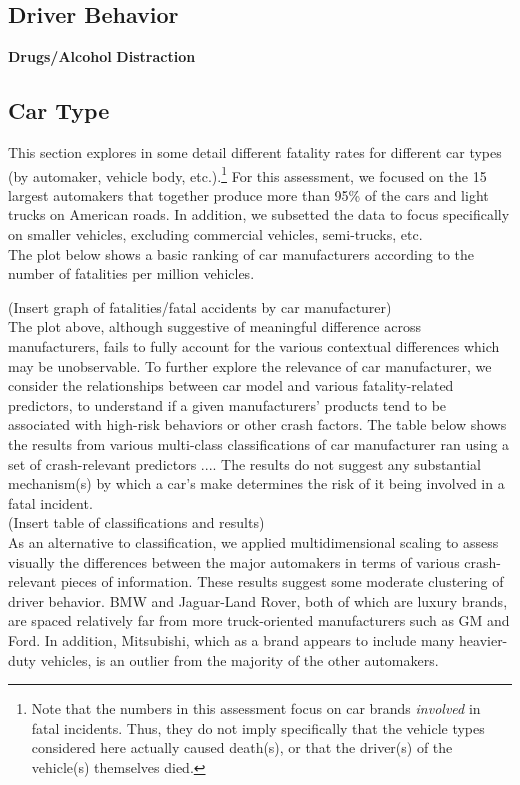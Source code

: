 \documentclass[11pt, oneside]{article}   	%
\begin{document}
\subsection*{Driver Behavior}
\textbf{Drugs/Alcohol}
\textbf{Distraction}

\subsection*{Car Type}

This section explores in some detail different fatality rates for different car types (by automaker, vehicle body, etc.).\footnote{Note that the numbers in this assessment focus on car brands \textit{involved} in fatal incidents. Thus, they do not imply specifically that the vehicle types considered here actually caused death(s), or that the driver(s) of the vehicle(s) themselves died.} For this assessment, we focused on the 15 largest automakers that together produce more than 95\% of the cars and light trucks on American roads. In addition, we subsetted the data to focus specifically on smaller vehicles, excluding commercial vehicles, semi-trucks, etc. \\

The plot below shows a basic ranking of car manufacturers according to the number of fatalities per million vehicles.

(Insert graph of fatalities/fatal accidents by car manufacturer) \\


The plot above, although suggestive of meaningful difference across manufacturers, fails to fully account for the various contextual differences which may be unobservable. To further explore the relevance of car manufacturer, we consider the relationships between car model and various fatality-related predictors, to understand if a given manufacturers' products tend to be associated with high-risk behaviors or other crash factors. The table below shows the results from various multi-class classifications of car manufacturer ran using a set of crash-relevant predictors .... The results do not suggest any substantial mechanism(s) by which a car's make determines the risk of it being involved in a fatal incident. \\

(Insert table of classifications and results) \\

As an alternative to classification, we applied multidimensional scaling to assess visually the differences between the major automakers in terms of various crash-relevant pieces of information. These results suggest some moderate clustering of driver behavior. BMW and Jaguar-Land Rover, both of which are luxury brands, are spaced relatively far from more truck-oriented manufacturers such as GM and Ford. In addition, Mitsubishi, which as a brand appears to include many heavier-duty vehicles, is an outlier from the majority of the other automakers.\\
\end{document}

